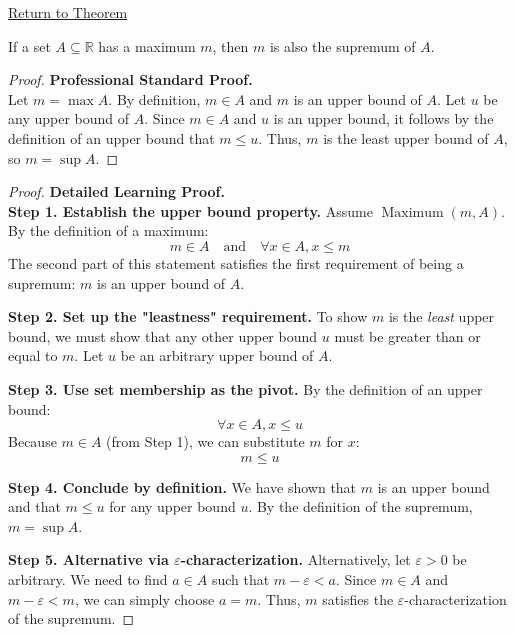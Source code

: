 \newpage
{}
\label{prf:maximum-implies-supremum}

\begin{remark*}[Return]
\hyperref[prop:maximum-implies-supremum]{Return to Theorem}
\end{remark*}

\begin{theorem*}
If a set $A \subseteq \mathbb{R}$ has a maximum $m$, then $m$ is also the supremum of $A$.
\end{theorem*}

\begin{proof}
\textbf{Professional Standard Proof.}~\\
Let $m = \max A$. By definition, $m \in A$ and $m$ is an upper bound of $A$. Let $u$ be any upper bound of $A$. Since $m \in A$ and $u$ is an upper bound, it follows by the definition of an upper bound that $m \le u$. Thus, $m$ is the least upper bound of $A$, so $m = \sup A$.
\end{proof}

\begin{proof}
\textbf{Detailed Learning Proof.}~\\

\textbf{Step 1. Establish the upper bound property.}
Assume $\operatorname{Maximum}(m, A)$. By the definition of a maximum:
\[ m \in A \quad \text{and} \quad \forall x \in A, x \le m \]
The second part of this statement satisfies the first requirement of being a supremum: $m$ is an upper bound of $A$.

\textbf{Step 2. Set up the "leastness" requirement.}
To show $m$ is the \textit{least} upper bound, we must show that any other upper bound $u$ must be greater than or equal to $m$. Let $u$ be an arbitrary upper bound of $A$.

\textbf{Step 3. Use set membership as the pivot.}
By the definition of an upper bound:
\[ \forall x \in A, x \le u \]
Because $m \in A$ (from Step 1), we can substitute $m$ for $x$:
\[ m \le u \]

\textbf{Step 4. Conclude by definition.}
We have shown that $m$ is an upper bound and that $m \le u$ for any upper bound $u$. By the definition of the supremum, $m = \sup A$.

\textbf{Step 5. Alternative via $\varepsilon$-characterization.}
Alternatively, let $\varepsilon > 0$ be arbitrary. We need to find $a \in A$ such that $m - \varepsilon < a$. Since $m \in A$ and $m - \varepsilon < m$, we can simply choose $a = m$. Thus, $m$ satisfies the $\varepsilon$-characterization of the supremum.
\end{proof}

